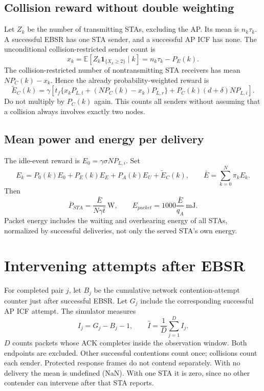 \documentclass[11pt,a4paper]{article}
\newcommand{\ind}{\mathbf{1}}
\newcommand{\avg}[1]{\sum_{k=0}^{N}\pi_k #1}
\begin{document}
\subsection{Collision reward without double weighting}
Let $Z_k$ be the number of transmitting STAs, excluding the AP. Its mean
is $n_k\tau_k$. A successful EBSR has one STA sender, and a successful AP
ICF has none. The unconditional collision-restricted sender count is
\begin{equation}
x_k=\mathbb E[Z_k\ind_{\{X_k\geq2\}}\mid k]
=n_k\tau_k-P_E(k).
\end{equation}
The collision-restricted number of nontransmitting STA receivers has mean
$NP_C(k)-x_k$. Hence the already probability-weighted reward is
\begin{equation}
\widetilde E_C(k)=\gamma\left[
t_f\{x_kP_{L,t}+(NP_C(k)-x_k)P_{L,r}\}
+P_C(k)(d+\delta)NP_{L,i}\right].
\end{equation}
Do not multiply by $P_C(k)$ again. This counts all senders without assuming
that a collision always involves exactly two nodes.

\subsection{Mean power and energy per delivery}
The idle-event reward is $E_0=\gamma\sigma NP_{L,i}$. Set
\begin{equation}
E_k=P_0(k)E_0+P_E(k)E_E+P_A(k)E_U+\widetilde E_C(k),
\qquad\bar E=\avg{E_k}.
\end{equation}
Then
\begin{equation}
\boxed{\overline P_{STA}=\frac{\bar E}{N\gamma\bar t}\ \text{W}},
\qquad
\boxed{E_{packet}=1000\frac{\bar E}{q_A}\ \text{mJ}}.
\end{equation}
Packet energy includes the waiting and overhearing energy of all STAs,
normalized by successful deliveries, not only the served STA's own energy.

\section{Intervening attempts after EBSR}
For completed pair $j$, let $B_j$ be the cumulative network contention-attempt
counter just after successful EBSR. Let $G_j$ include the corresponding
successful AP ICF attempt. The simulator measures
\begin{equation}
I_j=G_j-B_j-1,\qquad \widehat I=\frac1D\sum_{j=1}^{D}I_j.
\end{equation}
$D$ counts packets whose ACK completes inside the observation window.
Both endpoints are excluded. Other successful contentions count once;
collisions count each sender. Protected response frames do not contend
separately. With no delivery the mean is undefined (NaN). With one STA it
is zero, since no other contender can intervene after that STA reports.
\end{document}
